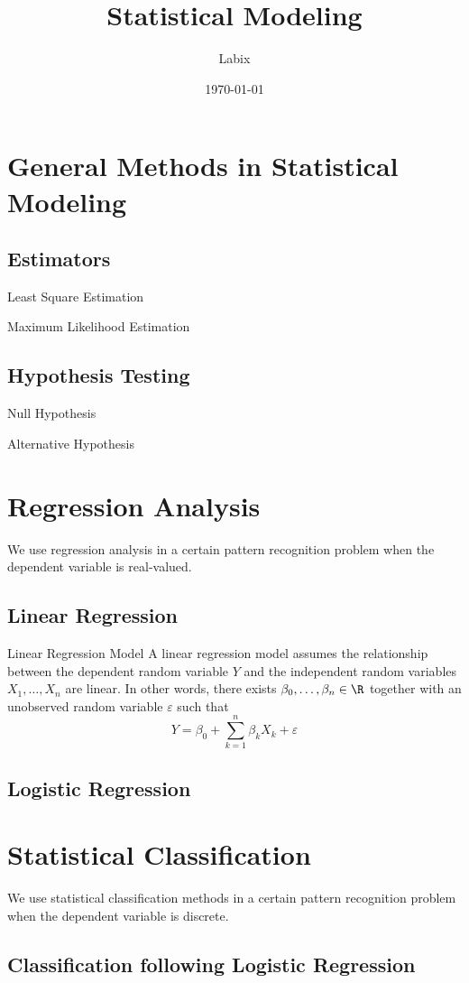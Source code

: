 \documentclass[a4paper]{article}
\title{Statistical Modeling}
\author{Labix}
\date{\today}
\begin{document}
\maketitle
\tableofcontents
\pagebreak

\section{General Methods in Statistical Modeling}
\subsection{Estimators}
\begin{defn}{Least Square Estimation}{}
\end{defn}

\begin{defn}{Maximum Likelihood Estimation}{}
\end{defn}

\subsection{Hypothesis Testing}
\begin{defn}{Null Hypothesis}{}
\end{defn}

\begin{defn}{Alternative Hypothesis}{}
\end{defn}

\pagebreak
\section{Regression Analysis}
We use regression analysis in a certain pattern recognition problem when the dependent variable is real-valued. 

\subsection{Linear Regression}
\begin{defn}{Linear Regression Model}{} A linear regression model assumes the relationship between the dependent random variable $Y$ and the independent random variables $X_1,\dots,X_n$ are linear. In other words, there exists $\beta_0,\dots,\beta_n\in\R$ together with an unobserved random variable $\varepsilon$ such that $$Y=\beta_0+\sum_{k=1}^n\beta_kX_k+\varepsilon$$
\end{defn}

\subsection{Logistic Regression}

\pagebreak
\section{Statistical Classification}
We use statistical classification methods in a certain pattern recognition problem when the dependent variable is discrete. 

\subsection{Classification following Logistic Regression}
\end{document}

